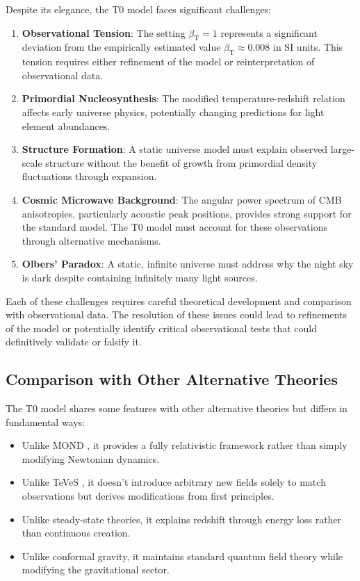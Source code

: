 \documentclass[12pt,a4paper]{article} %
\newcommand{\betaT}{\beta_{\text{T}}}
\begin{document}
	Despite its elegance, the T0 model faces significant challenges:
	\begin{enumerate}
		\item \textbf{Observational Tension}:
		The setting $\betaT = 1$ represents a significant deviation
		from the empirically estimated value $\betaT \approx 0.008$ in SI units. 
		This tension requires either refinement of the model
		or reinterpretation of observational data.
		\item \textbf{Primordial Nucleosynthesis}:
		The modified temperature-redshift relation
		affects early universe physics,
		potentially changing predictions for light element abundances.
		\item \textbf{Structure Formation}:
		A static universe model must explain observed large-scale structure
		without the benefit of growth from primordial density fluctuations
		through expansion.
		\item \textbf{Cosmic Microwave Background}:
		The angular power spectrum of CMB anisotropies,
		particularly acoustic peak positions,
		provides strong support for the standard model. 
		The T0 model must account for these observations
		through alternative mechanisms.
		\item \textbf{Olbers' Paradox}:
		A static, infinite universe must address
		why the night sky is dark despite containing infinitely many light sources.
	\end{enumerate}
	
	Each of these challenges requires careful theoretical development
	and comparison with observational data. 
	The resolution of these issues could lead to refinements of the model
	or potentially identify critical observational tests
	that could definitively validate or falsify it.
	
	\subsection{Comparison with Other Alternative Theories}
	\label{subsec:comparison_theories}
	
	The T0 model shares some features with other alternative theories
	but differs in fundamental ways:
	\begin{itemize}
		\item Unlike MOND \cite{Milgrom1983},
		it provides a fully relativistic framework
		rather than simply modifying Newtonian dynamics.
		\item Unlike TeVeS \cite{Bekenstein2004},
		it doesn't introduce arbitrary new fields
		solely to match observations
		but derives modifications from first principles.
		\item Unlike steady-state theories,
		it explains redshift through energy loss
		rather than continuous creation.
		\item Unlike conformal gravity,
		it maintains standard quantum field theory
		while modifying the gravitational sector.
	\end{itemize}
	
\end{document}
